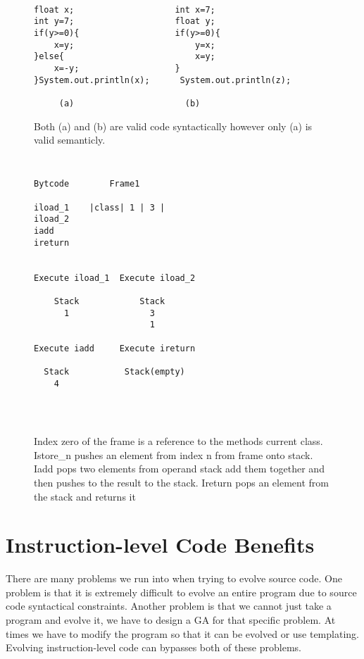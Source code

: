 \documentclass{sig-alternate}
\begin{document}
\begin{figure}
\centering
{\tt
\begin{verbatim}
float x;                    int x=7;
int y=7;                    float y;
if(y>=0){                   if(y>=0){
    x=y;                        y=x;
}else{                          x=y;
    x=-y;                   }
}System.out.println(x);      System.out.println(z);	
     
     (a)                      (b)

\end{verbatim}
}
\caption{Both (a) and (b) are valid code syntactically however only (a) is valid semanticly.}
\label{semantics}
\end{figure}

\begin{figure}
\centering
{\tt
\begin{verbatim}
Bytcode        Frame1  
           
iload_1	   |class| 1 | 3 |	
iload_2    
iadd       
ireturn


Execute iload_1  Execute iload_2   

    Stack            Stack            
      1                3               
                       1
                       
Execute iadd     Execute ireturn

  Stack           Stack(empty)
    4


          
\end{verbatim}
}
\caption{Index zero of the frame is a reference to the methods current class. Istore\_n pushes an element from index n from frame onto stack. Iadd pops two elements from operand stack add them together and then pushes to the result to the stack. Ireturn pops an element from the stack and returns it}
\label{stack}
\end{figure}


\section{Instruction-level Code Benefits}

There are many problems we run into when trying to evolve source code. One problem is that it is extremely difficult to evolve an entire program due to source code syntactical constraints. Another problem is that we cannot just take a program and evolve it, we have to design a GA for that specific problem. At times we have to modify the program so that it can be evolved or use templating. Evolving instruction-level code can bypasses both of these problems.
\end{document}
